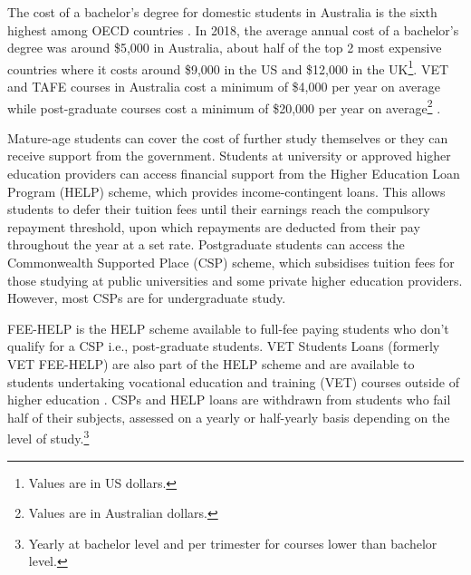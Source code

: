 \documentclass[12pt, a4paper]{article}
\begin{document}
%

The cost of a bachelor’s degree for domestic students in Australia is the sixth highest among OECD countries \citep{ua2020}. In 2018, the average annual cost of a bachelor’s degree was around \$5,000 in Australia, about half of the top 2 most expensive countries where it costs around \$9,000 in the US and \$12,000 in the UK\footnote{Values are in US dollars.}. VET and TAFE courses in Australia cost a minimum of \$4,000 per year on average while post-graduate courses cost a minimum of \$20,000 per year on average\footnote{Values are in Australian dollars.} \citep{studies2018}.

Mature-age students can cover the cost of further study themselves or they can receive support from the government. Students at university or approved higher education providers can access financial support from the Higher Education Loan Program (HELP) scheme, which provides income-contingent loans. This allows students to defer their tuition fees until their earnings reach the compulsory repayment threshold, upon which repayments are deducted from their pay throughout the year at a set rate. Postgraduate students can access the Commonwealth Supported Place (CSP) scheme, which subsidises tuition fees for those studying at public universities and some private higher education providers. However, most CSPs are for undergraduate study. 

FEE-HELP is the HELP scheme available to full-fee paying students who don’t qualify for a CSP i.e., post-graduate students. VET Students Loans (formerly VET FEE-HELP) are also part of the HELP scheme and are available to students undertaking vocational education and training (VET) courses outside of higher education \citep{ua2020}. CSPs and HELP loans are withdrawn from students who fail half of their subjects, assessed on a yearly or half-yearly basis depending on the level of study.\footnote{Yearly at bachelor level and per trimester for courses lower than bachelor level.}
\end{document}

